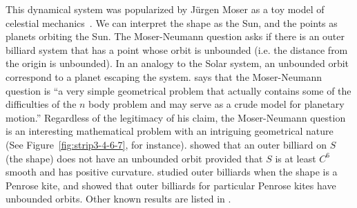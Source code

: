 \documentclass[12pt,twoside]{book}
\begin{document}
This dynamical system was popularized by Jürgen Moser as a toy model of celestial mechanics~\citep{moser,moserbook}.
We can interpret the shape as the Sun, and the points as planets orbiting the Sun.
The Moser-Neumann question asks if there is an outer billiard system that has a point whose orbit is unbounded (i.e. the distance from the origin is unbounded).
In an analogy to the Solar system, an unbounded orbit correspond to a planet escaping the system.
\citet{moser} says that the Moser-Neumann question is
``a very simple geometrical problem that actually contains some of the difficulties of the $n$ body problem and may serve as a crude model for planetary motion.''
Regardless of the legitimacy of his claim, the Moser-Neumann question is an interesting mathematical problem with an intriguing geometrical nature (See Figure~\ref{fig:strip3-4-6-7}, for instance).
\citet{moserbook} showed that an outer billiard on $S$ (the shape) does not have an unbounded orbit provided that $S$ is at least $C^6$ smooth and has positive curvature. 
\citet{schwartz} studied outer billiards when the shape is a Penrose kite, and showed that outer billiards for particular Penrose kites have unbounded orbits.
Other known results are listed in \citet[p. 2]{schwartz}.
\end{document}
